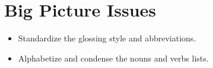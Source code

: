 \documentclass{article}
\begin{document}
\section{Big Picture Issues}

\begin{itemize}
\renewcommand\labelitemi{$\cdot$}

\item Standardize the glossing style and abbreviations.

\item Alphabetize and condense the nouns and verbs lists.

\end{itemize}
\end{document}
